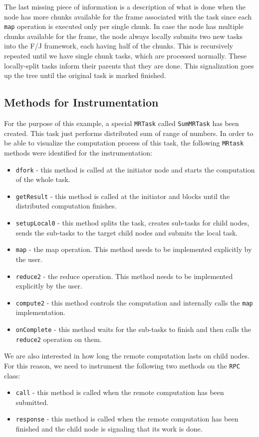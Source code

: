 The last missing piece of information is a description of what is done when the node has more chunks available for the frame associated with the task since each \texttt{map} operation is executed only per single chunk. In case the node has multiple chunks available for the frame, the node always locally submits two new tasks into the F/J framework, each having half of the chunks. This is recursively repeated until we have single chunk tasks, which are processed normally. These locally-split tasks inform their parents that they are done. This signalization goes up the tree until the original task is marked finished.

\subsection{Methods for Instrumentation}
For the purpose of this example, a special \texttt{MRTask} called \texttt{SumMRTask} has been created. This task just performs distributed sum of range of numbers. In order to be able to visualize the computation process of this task, the following \texttt{MRtask} methods were identified for the instrumentation:
\begin{itemize}
	\item \texttt{dfork} - this method is called at the initiator node and starts the computation of the whole task.
	\item \texttt{getResult} - this method is called at the initiator and blocks until the distributed computation finishes.
	\item \texttt{setupLocal0} - this method splits the task, creates sub-tasks for child nodes, sends the sub-tasks to the target child nodes and submits the local task.
	\item \texttt{map} - the map operation. This method needs to be implemented explicitly by the user. 
	\item \texttt{reduce2} - the reduce operation. This method needs to be implemented explicitly by the user. 
	\item \texttt{compute2} - this method controls the computation and internally calls the \texttt{map} implementation.
	\item \texttt{onComplete} - this method waits for the sub-tasks to finish and then calls the \texttt{reduce2} operation on them.
\end{itemize}

We are also interested in how long the remote computation lasts on child nodes. For this reason, we need to instrument the following two methods on the \texttt{RPC} class:
\begin{itemize}
	\item \texttt{call} - this method is called when the remote computation has been submitted.
	\item \texttt{response} - this method is called when the remote computation has been finished and the child node is signaling that its work is done.
\end{itemize}

